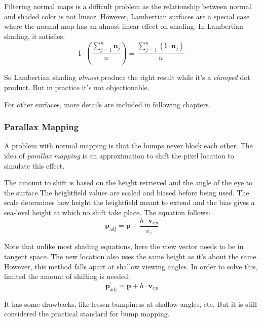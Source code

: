 \documentclass[10pt, a4paper]{article}
\begin{document}
        Filtering normal maps is a difficult problem as the relationship between normal and shaded color is not linear. However, Lambertian surfaces are a special case where the normal map has an almost linear effect on shading. In Lambertian shading, it satisfies: 
        \begin{equation*}
            \textbf{l} \cdot (\frac{\sum_{j = 1}^n\textbf{n}_j}{n}) = \frac{\sum_{j = 1}^n(\textbf{l} \cdot \textbf{n}_j)}{n} 
        \end{equation*}

        So Lambertian shading \emph{almost} produce the right result while it's a \emph{clamped} dot product. But in practice it's not objectionable. 

        For other surfaces, more details are included in following chapters. 

    \subsubsection{Parallax Mapping}
        A problem with normal mapping is that the bumps never block each other. The idea of \emph{parallax mapping} is an approximation to shift the pixel location to simulate this effect. 

        The amount to shift is based on the height retrieved and the angle of the eye to the surface.The heightfield values are scaled and biased before being used. The scale determines how height the heightfield meant to extend and the bias gives a sea-level height at which no shift take place. The equation follows: 
        \begin{equation*}
            \textbf{p}_{\text{adj}} = \textbf{p} + \frac{h\cdot \textbf{v}_{xy}}{v_{z}}
        \end{equation*} 
        
        Note that unlike most shading equations, here the view vector needs to be in tangent space. The new location also uses the same height as it's about the same. However, this method falls apart at shallow viewing angles. In order to solve this, limited the amount of shifting is needed: 
        \begin{equation*}
            \textbf{p}_{\text{adj}}^{'} = \textbf{p} + h\cdot \textbf{v}_{xy}
        \end{equation*}

        It has some drawbacks, like lessen bumpiness at shallow angles, etc. But it is still considered the practical standard for bump mapping. 
\end{document}
